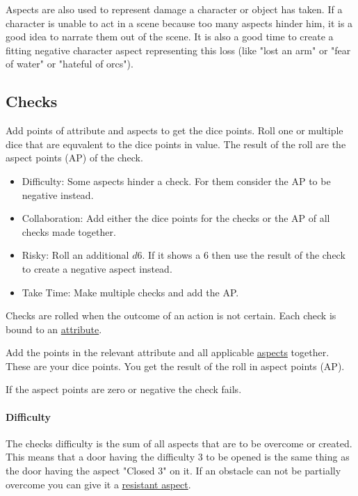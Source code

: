 \documentclass[11pt]{article}
\begin{document}
{Aspects are also used to represent damage a character or object has taken. If a character is unable to act in a scene because too many aspects hinder him, it is a good idea to narrate them out of the scene. It is also a good time to create a fitting negative character aspect representing this loss (like "lost an arm" or "fear of water" or "hateful of orcs").


\subsection{Checks}
\label{sec:orga558452}
\begin{short}
Add points of attribute and aspects to get the dice points. Roll one or multiple dice that are equvalent to the dice points in value. The result of the roll are the aspect points (AP) of the check.
\begin{itemize}
\item Difficulty: Some aspects hinder a check. For them consider the AP to be negative instead.
\item Collaboration: Add either the dice points for the checks or the AP of all checks made together.
\item Risky: Roll an additional \(d6\). If it shows a \(6\) then use the result of the check to create a negative aspect instead.
\item Take Time: Make multiple checks and add the AP.
\end{itemize}
\end{short}

Checks are rolled when the outcome of an action is not certain. Each check is bound to an \hyperref[sec:org6ff4736]{attribute}.

Add the points in the relevant attribute and all applicable \hyperref[sec:org253a543]{aspects} together. These are your dice points. You get the result of the roll in aspect points (AP).

If the aspect points are zero or negative the check fails.

\paragraph*{Difficulty}
\label{sec:org6448936}
The checks difficulty is the sum of all aspects that are to be overcome or created. This means that a door having the difficulty 3 to be opened is the same thing as the door having the aspect "Closed 3" on it. If an obstacle can not be partially overcome you can give it a \hyperref[sec:org126c678]{resistant aspect}.

}
\end{document}
